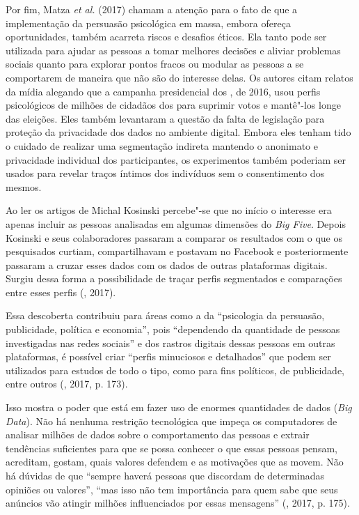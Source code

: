 Por fim, Matza \emph{et al.} (2017) chamam a atenção para o fato de que a
implementação da persuasão psicológica em massa, embora ofereça
oportunidades, também acarreta riscos e desafios éticos. Ela tanto pode
ser utilizada para ajudar as pessoas a tomar melhores decisões e aliviar
problemas sociais quanto para explorar pontos fracos ou modular as
pessoas a se comportarem de maneira que não são do interesse delas. Os
autores citam relatos da mídia alegando que a campanha presidencial dos
, de 2016, usou perfis psicológicos de milhões de cidadãos dos 
para suprimir votos e mantê"-los longe das eleições. Eles também
levantaram a questão da falta de legislação para proteção da privacidade
dos dados no ambiente digital. Embora eles tenham tido o cuidado de
realizar uma segmentação indireta mantendo o anonimato e privacidade
individual dos participantes, os experimentos também poderiam ser usados
para revelar traços íntimos dos indivíduos sem o consentimento dos
mesmos.

Ao ler os artigos de Michal Kosinski percebe"-se que no início o
interesse era apenas incluir as pessoas analisadas em algumas dimensões
do \emph{Big Five}. Depois Kosinski e seus colaboradores passaram a
comparar os resultados com o que os pesquisados curtiam, compartilhavam
e postavam no Facebook e posteriormente passaram a cruzar esses dados
com os dados de outras plataformas digitais. Surgiu dessa forma a
possibilidade de traçar perfis segmentados e comparações entre esses
perfis (, 2017).

Essa descoberta contribuiu para áreas como a da ``psicologia da
persuasão, publicidade, política e economia'', pois ``dependendo da
quantidade de pessoas investigadas nas redes sociais'' e dos rastros
digitais dessas pessoas em outras plataformas, é possível criar ``perfis
minuciosos e detalhados'' que podem ser utilizados para estudos de todo
o tipo, como para fins políticos, de publicidade, entre outros
(, 2017, p. 173).

Isso mostra o poder que está em fazer uso de enormes quantidades de
dados (\emph{Big Data}). Não há nenhuma restrição tecnológica que impeça
os computadores de analisar milhões de dados sobre o comportamento das
pessoas e extrair tendências suficientes para que se possa conhecer o
que essas pessoas pensam, acreditam, gostam, quais valores defendem e as
motivações que as movem. Não há dúvidas de que ``sempre haverá pessoas
que discordam de determinadas opiniões ou valores'', ``mas isso não tem
importância para quem sabe que seus anúncios vão atingir milhões
influenciados por essas mensagens'' (, 2017, p. 175).

